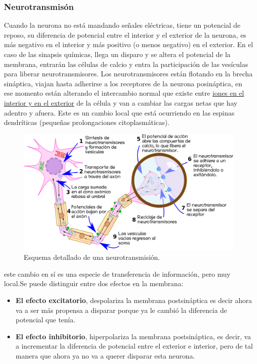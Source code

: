 \subsubsection{Neurotransmisón}
Cuando la neurona no está mandando señales eléctricas, tiene un potencial de reposo, su diferencia de potencial entre el interior y el exterior de la neurona, es más negativo en el interior y más positivo (o menos negativo) en el exterior.
En el caso de las sinapsis químicas, llega un disparo y se altera el potencial de la membrana, entrarán las
células de calcio y entra la participación de las vesículas para liberar neurotransmisores. Los neurotransmisores están flotando en la brecha sináptica, viajan hasta adherirse a los receptores de la neurona posináptica, en ese momento están alterando el intercambio normal que existe entre \underline{iones en el interior y en el exterior} de la célula y van a cambiar las cargas netas que hay adentro y afuera. Este es un cambio local que está ocurriendo en las  espinas dendríticas (pequeñas prolongaciones citoplasmáticas).


\begin{figure}[h]
 \centering
 \includegraphics[scale=0.2]{../Figuras/neurotransmision.png} 
 \caption{Esquema detallado de una neurotransmisión.}
 \label{fig:nTransmision}
\end{figure}


este cambio en sí es una especie de transferencia de información, pero muy local.Se puede distinguir entre dos efectos en la membrana: 


\begin{itemize}
\item \textbf{El efecto excitatorio}, despolariza la membrana postsináptica es decir ahora va a ser más propensa a disparar porque ya le cambió la diferencia de potencial que tenía.  
\item \textbf{El efecto inhibitorio}, hiperpolariza la membrana postsináptica, es decir, va a incrementar la diferencia de potencial entre el exterior e interior, pero de tal manera que ahora ya no va a querer disparar esta neurona.
\end{itemize}


